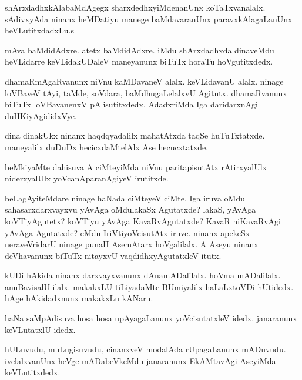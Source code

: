 \documentclass{article}
\begin{document}
\begin{mn}
shArxdadhxkAlabaMdAgegx sharxdedhxyiMdenanUnx  koTaTxvanalalx. sAdivxyAda 
ninanx heMDatiyu manege baMdavaranUnx paravxkAlagaLanUnx heVLutitxdadxLu.s
\end{mn}

\begin{mn}
mAva baMdidAdxre.  atetx  baMdidAdxre.  iMdu shArxdadhxda dinaveMdu heVLidarre  
keVLidakUDaleV  maneyanunx biTuTx  horaTu hoVgutitxdedx.
\end{mn}

\begin{mn}
dhamaRmAgaRvanunx niVnu kaMDavaneV alalx.  keVLidavanU alalx.  ninage 
loVBaveV tAyi, taMde, soVdara, baMdhugaLelalxvU Agitutx.  dhamaRvanunx 
biTuTx loVBavanenxV pAlisutitxdedx.  AdadxriMda  Iga  daridarxnAgi duHKiyAgididxVye.
\end{mn}

\begin{mn}
dina dinakUkx ninanx haqdqyadalilx mahatAtxda  taqSe huTuTxtatxde.  
maneyalilx duDuDx hecicxdaMtelAlx Ase hecucxtatxde.
\end{mn}

\begin{mn}
beMkiyaMte dahisuva A ciMteyiMda niVnu paritapisutAtx  rAtirxyalUlx 
niderxyalUlx yoVcanAparanAgiyeV irutitxde.
\end{mn}

\begin{mn}
beLagAyiteMdare ninage haNada ciMteyeV ciMte. Iga iruva oMdu sahasarxdarxvayxvu 
yAvAga oMdulakaSx Agutatxde?  lakaS, yAvAga koVTiyAgutetx?  koVTiyu yAvAga 
KavaRvAgutatxde?  KavaR niKavaRvAgi yAvAga Agutatxde? eMdu  IriVtiyoVcisutAtx 
iruve.  ninanx apekeSx neraveVridarU ninage  punaH AsemAtarx hoVgalilalx.  
A Aseyu ninanx deVhavanunx biTuTx nitayxvU vaqdidhxyAgutatxleV itutx.
\end{mn}

\begin{mn}
kUDi hAkida ninanx darxvayxvanunx dAnamADalilalx.  hoVma mADalilalx.  
anuBavisalU ilalx.  makakxLU tiLiyadaMte BUmiyalilx haLaLxtoVDi 
hUtidedx.  hAge hAkidadxnunx makakxLu kANaru.
\end{mn}

\begin{mn}
haNa saMpAdisuva hosa hosa upAyagaLanunx yoVcisutatxleV idedx.  janaranunx  keVLutatxlU idedx.
\end{mn}

\begin{mn}
hULuvudu, muLugisuvudu, cinanxveV modalAda rUpagaLanunx mADuvudu.  
ivelalxvanUnx  heVge mADabeVkeMdu  janaranunx EkAMtavAgi AseyiMda  keVLutitxdedx.
\end{mn}
\end{document}
